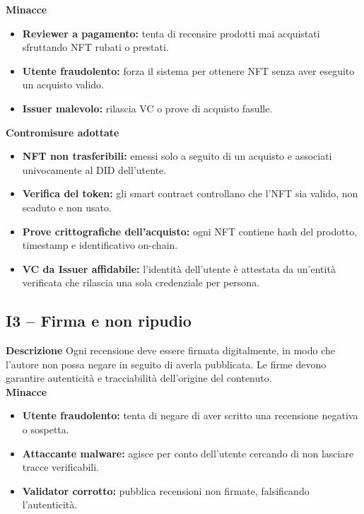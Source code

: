             \noindent \textbf{Minacce}
                \begin{itemize}
                    \item \textbf{Reviewer a pagamento:} tenta di recensire prodotti mai acquistati sfruttando NFT rubati o prestati.

                    \item \textbf{Utente fraudolento:} forza il sistema per ottenere NFT senza aver eseguito un acquisto valido.

                    \item \textbf{Issuer malevolo:} rilascia VC o prove di acquisto fasulle.
                \end{itemize}

            \noindent \textbf{Contromisure adottate}
                \begin{itemize}
                    \item \textbf{NFT non trasferibili:} emessi solo a seguito di un acquisto e associati univocamente al DID dell'utente.

                    \item \textbf{Verifica del token:} gli smart contract controllano che l’NFT sia valido, non scaduto e non usato.

                    \item \textbf{Prove crittografiche dell'acquisto:} ogni NFT contiene hash del prodotto, timestamp e identificativo on-chain.

                    \item \textbf{VC da Issuer affidabile:} l'identità dell'utente è attestata da un'entità verificata che rilascia una sola credenziale per persona.
                \end{itemize}

        \subsection{I3 – Firma e non ripudio}
            \noindent \textbf{Descrizione}
                Ogni recensione deve essere firmata digitalmente, in modo che l'autore non possa negare in seguito di averla pubblicata. Le firme devono garantire autenticità e tracciabilità dell'origine del contenuto. \\

            \noindent \textbf{Minacce}
                \begin{itemize}
                    \item \textbf{Utente fraudolento:} tenta di negare di aver scritto una recensione negativa o sospetta.

                    \item \textbf{Attaccante malware:} agisce per conto dell'utente cercando di non lasciare tracce verificabili.

                    \item \textbf{Validator corrotto:} pubblica recensioni non firmate, falsificando l'autenticità.
                \end{itemize}

